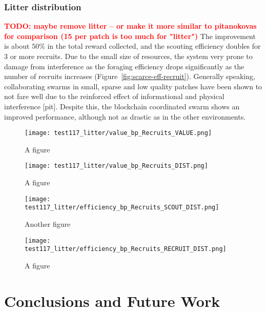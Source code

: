 \documentclass[runningheads]{llncs}
\newcommand{\todo}[1]{\textcolor{red}{\textbf{TODO: #1}}}
\begin{document}
\subsubsection{Litter distribution}
\todo{maybe remove litter -- or make it more similar to pitanokovas for comparison (15 per patch is too much for "litter")}
 The improvement is about $50$\% in the total reward collected, and the scouting efficiency doubles for $3$ or more recruits. Due to the small size of resources, the system very prone to damage from interference as the foraging efficiency drops significantly as the number of recruits increases (Figure~\ref{fig:scarce-eff-recruit}). Generally speaking, collaborating swarms in small, sparse and low quality patches have been shown to not fare well due to the reinforced effect of informational and physical interference [pit]. Despite this, the blockchain coordinated swarm shows an improved performance, although not as drastic as in the other environments.

\begin{figure}
\centering
\begin{minipage}{.495\textwidth}
  \centering
  \texttt{[image: test117\_litter/value\_bp\_Recruits\_VALUE.png]}
  \caption{A figure}
  \label{fig:litter-value}
\end{minipage}
\begin{minipage}{.495\textwidth}
  \centering
  \texttt{[image: test117\_litter/value\_bp\_Recruits\_DIST.png]}
  \caption{A figure}
  \label{fig:litter-dist}
\end{minipage}
\end{figure}

\begin{figure}
\centering
\begin{minipage}{.495\textwidth}
  \centering
  \texttt{[image: test117\_litter/efficiency\_bp\_Recruits\_SCOUT\_DIST.png]}
  \caption{Another figure}
  \label{fig:litter-eff-scout}
\end{minipage}
\begin{minipage}{.495\textwidth}
  \centering
  \texttt{[image: test117\_litter/efficiency\_bp\_Recruits\_RECRUIT\_DIST.png]}
  \caption{A figure}
  \label{fig:litter-eff-rec}
\end{minipage}
\end{figure}

\section{Conclusions and Future Work}
\label{sec:conclusion}
\end{document}

